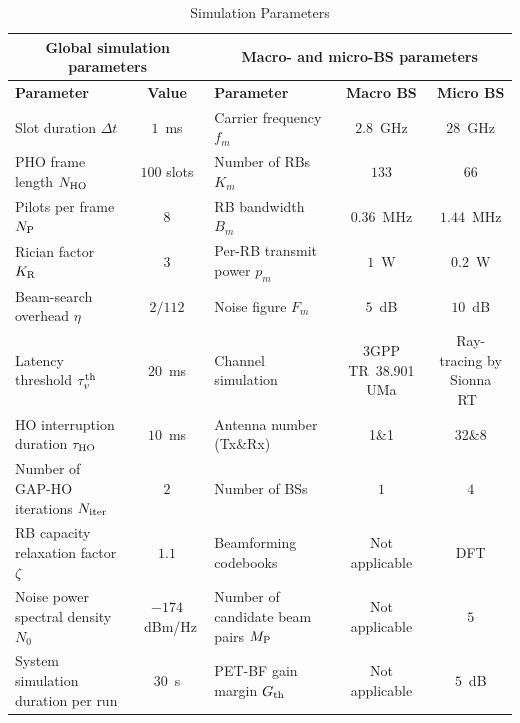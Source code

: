 \documentclass[10pt,journal,letterpaper]{IEEEtran}
\newcommand{\rev}[1]{\textcolor{revisioncolor}{{}#1}}
\newcommand{\omitted}[1]{}
\theoremstyle{remark}
\begin{document}
\begin{table}[htbp]
    \centering
    \caption{Simulation Parameters}
    \label{tab:sim-params}
    \setlength{\tabcolsep}{4pt}
    \begin{tabular*}{\textwidth}{@{\extracolsep{\fill}}l c | l c c}
        \hline
        \multicolumn{2}{c|}{\textbf{Global simulation parameters}}
        & \multicolumn{3}{c}{\textbf{Macro- and micro-BS parameters}} \\
        \hline
        \textbf{Parameter} & \textbf{Value}
        & \textbf{Parameter} & \textbf{Macro BS} & \textbf{Micro BS} \\
        \hline
        Slot duration $\Delta t$ & $1$~ms
        & Carrier frequency $f_m$ & $2.8$~GHz & $28$~GHz \\

        PHO frame length $N_{\rm HO}$ & $100$ slots
        & Number of RBs $K_m$ & $133$ & $66$ \\

        Pilots per frame $N_{\rm P}$ & $8$
        & RB bandwidth $B_m$ & $0.36$~MHz & $1.44$~MHz \\

        Rician factor $K_{\rm R}$ & $3$
        & Per-RB transmit power $p_m$ & $1$~W & $0.2$~W \\

        Beam-search overhead $\eta$ & $2/112$
        & Noise figure $F_m$ & $5$~dB & $10$~dB \\

        Latency threshold \omitted{}\rev{$\tau_v^{\rm th}$} & $20$~ms
        & Channel simulation &
        3GPP TR~38.901 UMa & Ray-tracing by Sionna RT~\cite{sionnaRT} \\

        \rev{HO interruption duration $\tau_{\rm HO}$} & \rev{$10$~ms}
        & Antenna number (Tx\&Rx) & 1\&1 & 32\&8 \\

        \rev{Number of GAP-HO iterations $N_{\rm iter}$} & \rev{$2$}
        & \rev{Number of BSs} & \rev{$1$} & \rev{$4$}\\

        \rev{RB capacity relaxation factor $\zeta$} & \rev{$1.1$}
        & \rev{Beamforming codebooks} & \rev{Not applicable} & \rev{DFT} \\

        Noise power spectral density $N_0$ & $-174$~dBm/Hz
        & \rev{Number of candidate beam pairs $M_{\rm P}$} & \rev{Not applicable} & \rev{$5$} \\

        \rev{System simulation duration per run} & \rev{$30$~s}
        & \rev{PET-BF gain margin $G_{\rm th}$} & \rev{Not applicable} & \rev{$5$~dB} \\
        \hline
    \end{tabular*}
\end{table}
\end{document}
